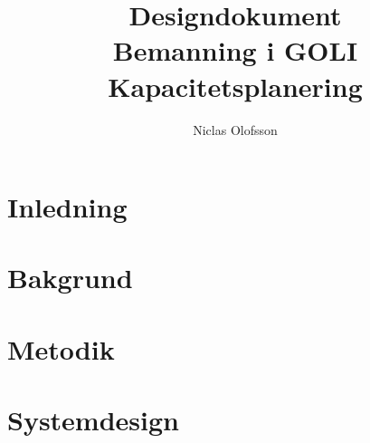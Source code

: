 \documentclass[a4paper]{article}
\author{Niclas Olofsson}
\title{Designdokument\\Bemanning i GOLI Kapacitetsplanering}
\begin{document}
\maketitle

\section{Inledning}


\section{Bakgrund}


\section{Metodik}


\section{Systemdesign}



%
\end{document}
